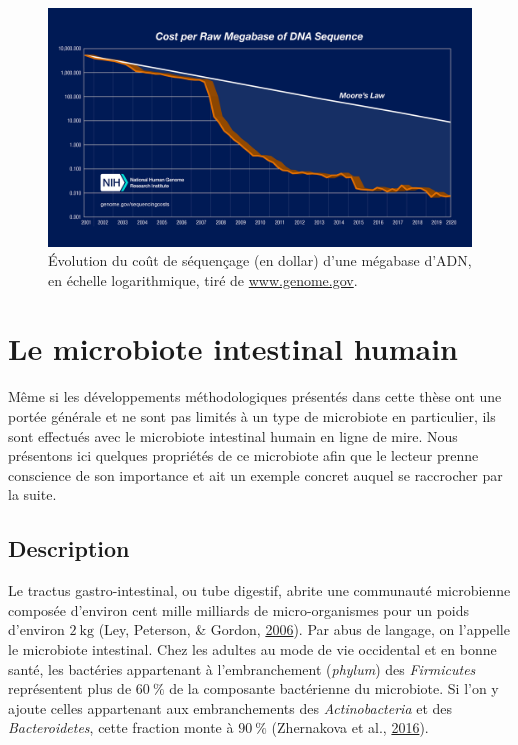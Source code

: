 \documentclass[12pt,a4paper]{reedthesis}
\theoremstyle{definition}
\theoremstyle{definition}
\theoremstyle{definition}
\theoremstyle{remark}
\begin{document}
\begin{figure}[t]

{\centering \includegraphics[width=0.9\linewidth]{img/couts} 

}

\caption{Évolution du coût de séquençage (en dollar) d'une mégabase d'ADN, en échelle logarithmique, tiré de \url{www.genome.gov}.}\label{fig:couts}
\end{figure}
\hypertarget{microbiote}{%
\section{Le microbiote intestinal humain}\label{microbiote}}

Même si les développements méthodologiques présentés dans cette thèse ont une portée générale et ne sont pas limités à un type de microbiote en particulier, ils sont effectués avec le microbiote intestinal humain en ligne de mire. Nous présentons ici quelques propriétés de ce microbiote afin que le lecteur prenne conscience de son importance et ait un exemple concret auquel se raccrocher par la suite.

\hypertarget{description}{%
\subsection{Description}\label{description}}

Le tractus gastro-intestinal, ou tube digestif, abrite une communauté microbienne composée d'environ cent mille milliards de micro-organismes pour un poids d'environ \(2~\text{kg}\) (Ley, Peterson, \& Gordon, \protect\hyperlink{ref-ley2006ecological}{2006}). Par abus de langage, on l'appelle le microbiote intestinal. Chez les adultes au mode de vie occidental et en bonne santé, les bactéries appartenant à l'embranchement (\emph{phylum}) des \emph{Firmicutes} représentent plus de \(60~\%\) de la composante bactérienne du microbiote. Si l'on y ajoute celles appartenant aux embranchements des \emph{Actinobacteria} et des \emph{Bacteroidetes}, cette fraction monte à \(90~\%\) (Zhernakova et al., \protect\hyperlink{ref-zhernakova2016population}{2016}).
\end{document}
